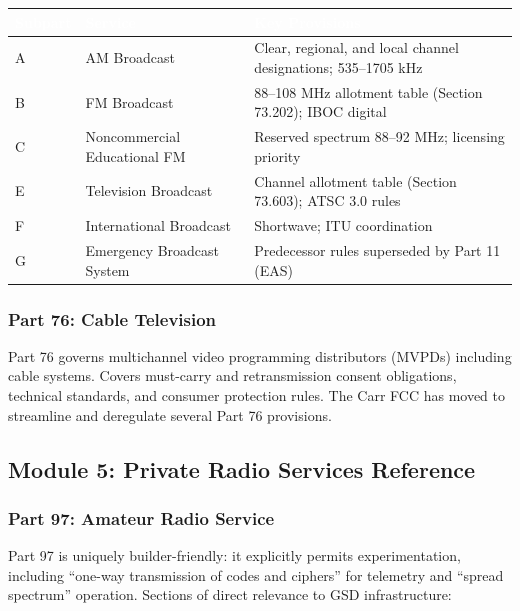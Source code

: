 \documentclass[11pt,letterpaper]{article}
\newcommand{\tableheader}[1]{\textbf{\sffamily\textcolor{white}{#1}}}
\begin{document}
\begin{center}
\begin{tabularx}{\textwidth}{L{2.5cm}L{4cm}X}
\toprule
{}
\tableheader{Subpart} & \tableheader{Service} & \tableheader{Key Provisions} \\
\midrule
A & AM Broadcast & Clear, regional, and local channel designations; 535--1705 kHz \\
B & FM Broadcast & 88--108 MHz allotment table (Section 73.202); IBOC digital \\
C & Noncommercial Educational FM & Reserved spectrum 88--92 MHz; licensing priority \\
E & Television Broadcast & Channel allotment table (Section 73.603); ATSC 3.0 rules \\
F & International Broadcast & Shortwave; ITU coordination \\
G & Emergency Broadcast System & Predecessor rules superseded by Part 11 (EAS) \\
\bottomrule
\end{tabularx}
\end{center}

\subsubsection{Part 76: Cable Television}

Part 76 governs multichannel video programming distributors (MVPDs) including cable systems. Covers must-carry and retransmission consent obligations, technical standards, and consumer protection rules. The Carr FCC has moved to streamline and deregulate several Part 76 provisions.

\subsection{Module 5: Private Radio Services Reference}

\subsubsection{Part 97: Amateur Radio Service}

Part 97 is uniquely builder-friendly: it explicitly permits experimentation, including ``one-way transmission of codes and ciphers'' for telemetry and ``spread spectrum'' operation. Sections of direct relevance to GSD infrastructure:
\end{document}
